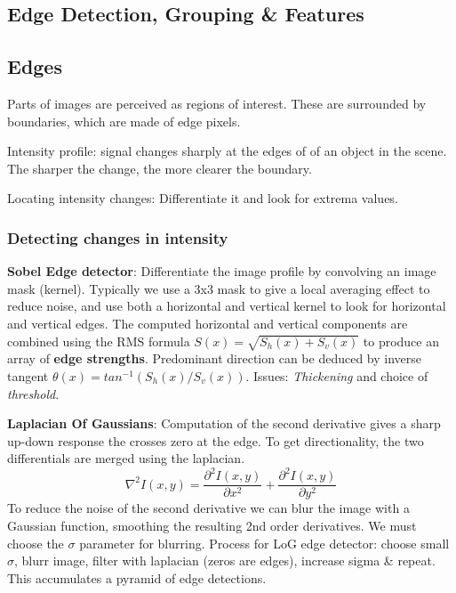 \documentclass[8pt]{extarticle}
\begin{document}
\begin{multicols}{2}
\section{Edge Detection, Grouping \& Features}

\subsection{Edges}
\begin{compactitem}
    \item Parts of images are perceived as regions of interest. These are surrounded by boundaries, which are made of edge pixels.
    \item Intensity profile: signal changes sharply at the edges of of an object in the scene. The sharper the change, the more clearer the boundary.
    \item Locating intensity changes: Differentiate it and look for extrema values.
\end{compactitem}

\subsubsection{Detecting changes in intensity}
\textbf{Sobel Edge detector}: Differentiate the image profile by convolving an image mask (kernel). Typically we use a 3x3 mask to give a local averaging effect to reduce noise, and use both a horizontal and vertical kernel to look for horizontal and vertical edges. The computed horizontal and vertical components are combined using the RMS formula $S(x) = \sqrt{S_h(x) + S_v(x)}$ to produce an array of \textbf{edge strengths}. Predominant direction can be deduced by inverse tangent $\theta(x) = tan^{-1}(S_h(x) / S_v(x))$. Issues: \textit{Thickening} and choice of \textit{threshold}.

\textbf{Laplacian Of Gaussians}: Computation of the second derivative gives a sharp up-down response the crosses zero at the edge. To get directionality, the two         differentials are merged using the laplacian.
    \begin{equation}
        \nabla^2I(x,y) = \frac{\partial^2 I(x,y)}{\partial x^2} + \frac{\partial^2 I(x,y)}{\partial y^2}
    \end{equation}
    To reduce the noise of the second derivative we can blur the image with a Gaussian function, smoothing the resulting 2nd order derivatives. We must choose the $\sigma$ parameter for blurring. Process for LoG edge detector: choose small $\sigma$, blurr image, filter with laplacian (zeros are edges), increase sigma \& repeat. This accumulates a pyramid of edge detections.


\end{multicols}
\end{document}

